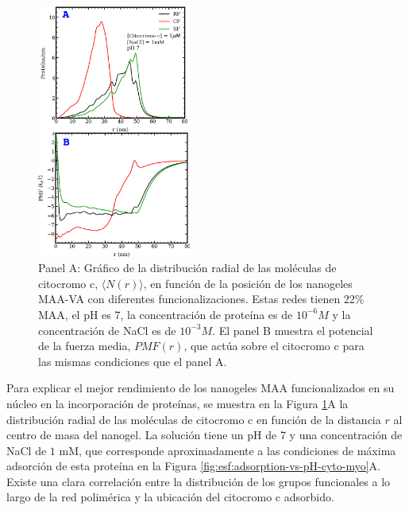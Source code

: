 
\begin{figure}[!htb]
     \centering
     \includegraphics[width=0.45\textwidth]{Figures/graphs-gel2/cito-adsr-pmf.pdf}
     \caption{Panel A: Gr\'afico de la distribuci\'on radial de las mol\'eculas de citocromo c, $\langle N(r)\rangle$, en funci\'on de la posici\'on de los nanogeles MAA-VA con diferentes funcionalizaciones.
     	Estas redes tienen 22\% MAA, el pH es 7, la concentraci\'on de prote\'ina es de $10^{-6}M$ y la concentraci\'on de NaCl es de $10^{-3}M$.
     	El panel B muestra el potencial de la fuerza media, ${PMF}(r)$, que act\'ua sobre el citocromo c para las mismas condiciones que el panel A.}
     \label{fig:esf:adsorption-vs-r-cyto}
 \end{figure}



Para explicar el mejor rendimiento de los nanogeles MAA funcionalizados en su n\'ucleo en la incorporaci\'on de prote\'inas, se muestra en la Figura \ref{fig:esf:adsorption-vs-r-cyto}A la distribuci\'on radial de las mol\'eculas de citocromo c en funci\'on de la distancia $r$ al centro de masa del nanogel. La soluci\'on tiene un pH de 7 y una concentraci\'on de NaCl de $1 $ mM, que corresponde aproximadamente a las condiciones de m\'axima adsorci\'on de esta prote\'ina en la Figura \ref{fig:esf:adsorption-vs-pH-cyto-myo}A. Existe una clara correlaci\'on entre la distribuci\'on de los grupos funcionales a lo largo de la red polim\'erica y la ubicaci\'on del citocromo c adsorbido.


